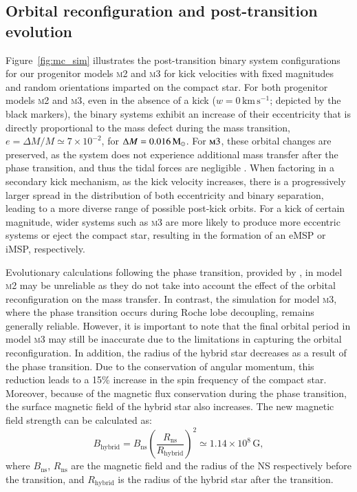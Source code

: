 \documentclass[main.tex]{subfiles}
\begin{document}
    \subsection{Orbital reconfiguration and post-transition evolution} \label{sec:ch4:posttrans_evolution}
    Figure~\ref{fig:mc_sim} illustrates the post-transition binary system configurations for our progenitor models \textsc{m2} and \textsc{m3} for kick velocities with fixed magnitudes and random orientations imparted on the compact star. 
    For both progenitor models \textsc{m2} and \textsc{m3},  even in the absence of a kick ($w=0\,\mathrm{km\,s^{-1}}$; depicted by the black markers), the binary systems exhibit an increase of their eccentricity that is directly proportional to the mass defect during the mass transition, $e = \Delta M / M \simeq 7\times10^{-2}$, for $\Delta M = 0.016\mathrm{\,M_\odot}$. 
    For $\textsc{m3}$, these orbital changes are preserved, as the system does not experience additional mass transfer after the phase transition, and thus the tidal forces are negligible \citep{Freire:mnras14, antoniadis:apjl14, Jiang:apj15}. 
    When factoring in a secondary kick mechanism, as the kick velocity increases, there is a progressively larger spread in the distribution of both eccentricity and binary separation, leading to a more diverse range of possible post-kick orbits. 
    For a kick of certain magnitude, wider systems such as \textsc{m3} are more likely to produce more eccentric systems or eject the compact star, resulting in the formation of an eMSP or iMSP, respectively.  
    
    Evolutionary calculations following the phase transition, provided by \mesa, in model \textsc{m2} may be unreliable as they do not take into account the effect of the orbital reconfiguration on the mass transfer. In contrast, the simulation for model \textsc{m3}, where the phase transition occurs during Roche lobe decoupling, remains generally reliable. However, it is important to note that the final orbital period in model \textsc{m3} may still be inaccurate due to the limitations in capturing the orbital reconfiguration.
    In addition, the radius of the hybrid star decreases as a result of the phase transition. Due to the conservation of angular momentum, this reduction leads to a 15\% increase in the spin frequency of the compact star. 
    Moreover, because of the magnetic flux conservation during the phase transition, the surface magnetic field of the hybrid star also increases. The new magnetic field strength can be calculated as:
    \begin{equation}
        B_\mathrm{hybrid} = B_\mathrm{ns} \left(\frac{R_\mathrm{ns}}{R_\mathrm{hybrid}}\right)^2 \simeq 1.14 \times 10^8\,\mathrm{G},
    \end{equation}
    where $B_\mathrm{ns}$, $R_\mathrm{ns}$ are the magnetic field and the radius of the NS respectively before the transition, and $R_\mathrm{hybrid}$ is the radius of the hybrid star after the transition.
    
\end{document}
